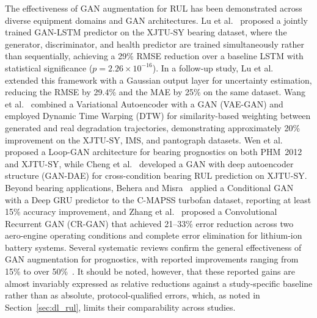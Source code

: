 \documentclass[review]{elsarticle}
\begin{document}
The effectiveness of GAN augmentation for RUL has been demonstrated
across diverse equipment domains and GAN architectures.
Lu et al.~\cite{9486650} proposed a jointly trained GAN-LSTM
predictor on the XJTU-SY bearing dataset, where the generator,
discriminator, and health predictor are trained simultaneously rather
than sequentially, achieving a 29\% RMSE reduction over a baseline
LSTM with statistical significance ($p = 2.26 \times 10^{-16}$).
In a follow-up study, Lu et al.~\cite{lu_joint_2022} extended this
framework with a Gaussian output layer for uncertainty estimation,
reducing the RMSE by 29.4\% and the MAE by 25\% on the same dataset.
Wang et al.~\cite{vibration7020029} combined a Variational
Autoencoder with a GAN (VAE-GAN) and employed Dynamic Time Warping
(DTW) for similarity-based weighting between generated and real
degradation trajectories, demonstrating approximately 20\%
improvement on the XJTU-SY, IMS, and pantograph datasets.
Wen et al.~\cite{wen_gru-ae-wiener_2024} proposed a Loop-GAN
architecture for bearing prognostics on both PHM~2012 and XJTU-SY,
while Cheng et al.~\cite{cheng_remaining_2023} developed a GAN with
deep autoencoder structure (GAN-DAE) for cross-condition bearing RUL
prediction on XJTU-SY. Beyond bearing applications,
Behera and Misra~\cite{behera_generative_2021} applied a Conditional
GAN with a Deep GRU predictor to the C-MAPSS turbofan dataset,
reporting at least 15\% accuracy improvement, and
Zhang et al.~\cite{9300234} proposed a Convolutional Recurrent GAN
(CR-GAN) that achieved 21--33\% error reduction across two
aero-engine operating conditions and complete error elimination for
lithium-ion battery systems. Several systematic reviews confirm the
general effectiveness of GAN augmentation for prognostics, with
reported improvements ranging from 15\% to over
50\%~\cite{11129693, khan_generative_2025, nieminen_synthetic_2026}.
It should be noted, however, that these reported gains are almost
invariably expressed as relative reductions against a study-specific
baseline rather than as absolute, protocol-qualified errors, which,
as noted in Section~\ref{sec:dl_rul}, limits their comparability
across studies.\\
\end{document}
